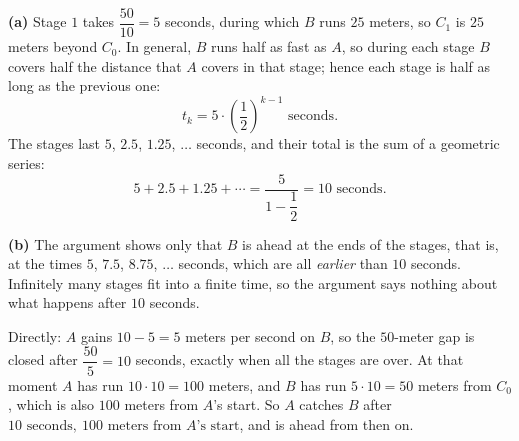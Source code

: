 \textbf{(a)} Stage $1$ takes $\dfrac{50}{10}=5$ seconds, during which $B$ runs $25$ meters, so $C_1$ is $25$ meters beyond $C_0$. In general, $B$ runs half as fast as $A$, so during each stage $B$ covers half the distance that $A$ covers in that stage; hence each stage is half as long as the previous one:
\[t_k=5\cdot\left(\dfrac12\right)^{k-1}\text{ seconds}.\]
The stages last $5$, $2.5$, $1.25$, $\dots$ seconds, and their total is the sum of a geometric series:
\[5+2.5+1.25+\cdots=\dfrac{5}{1-\dfrac12}=\boxed{10\text{ seconds}}.\]

\textbf{(b)} The argument shows only that $B$ is ahead at the ends of the stages, that is, at the times $5$, $7.5$, $8.75$, $\dots$ seconds, which are all \emph{earlier} than $10$ seconds. Infinitely many stages fit into a finite time, so the argument says nothing about what happens after $10$ seconds.

Directly: $A$ gains $10-5=5$ meters per second on $B$, so the $50$-meter gap is closed after $\dfrac{50}{5}=10$ seconds, exactly when all the stages are over. At that moment $A$ has run $10\cdot10=100$ meters, and $B$ has run $5\cdot10=50$ meters from $C_0$, which is also $100$ meters from $A$'s start. So $A$ catches $B$ after $\boxed{10\text{ seconds},\ 100\text{ meters from }A\text{'s start}}$, and is ahead from then on.
